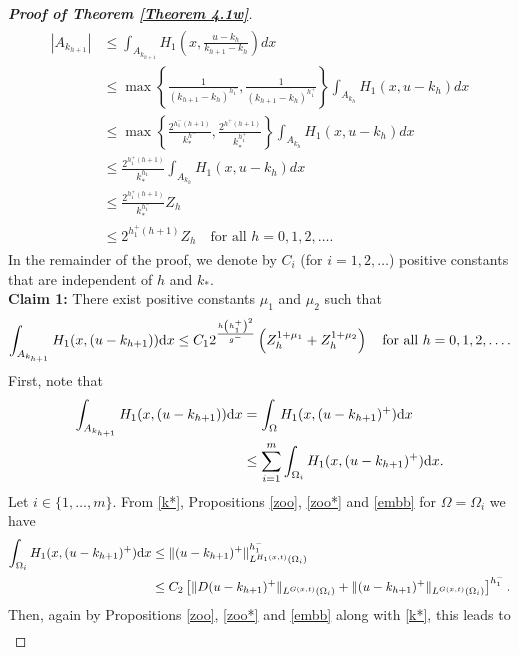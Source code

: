 \documentclass[10pt,reqno]{amsart}
\newcommand *\w{^\wedge}
\theoremstyle{definition}
\numberwithin{equation}{section}
\begin{document}
\begin{proof}[\textbf{Proof of Theorem \ref{Theorem 4.1w}}]
\begin{align}
\begin{split}
			|A_{k_{h+1}}|
			& \leq \int_{A_{k_{h+1}}}H_1\left (x,\frac{u-k_h}{k_{h+1}-k_h}\right )d x\\
            & \leq \max\left\lbrace \frac{1}{(k_{h+1}-k_h)^{h^-_1}},\frac{1}{(k_{h+1}-k_h)^{h^+_1}} \right\rbrace\int_{A_{k_{h}}} H_1\left (x,u-k_h\right )d x\\
             & \leq \max\left\lbrace \frac{2^{h^-_1(h+1)}}{k_*^{h^-}},\frac{2^{h^+(h+1)}}{k_*^{h^+_1}} \right\rbrace\int_{A_{k_{h}}} H_1\left (x,u-k_h\right )d x\\
             & \leq  \frac{2^{h^+_1(h+1)}}{k_*^{h^-_1}}\int_{A_{k_{h}}} H_1\left (x,u-k_h\right )d x\\
			& \leq \frac{2^{h^+_1(h+1)}}{k_*^{h^-_1}} Z_h\\
			& \leq 2^{h^+_1(h+1)} Z_h\quad \text{for all }h=0,1,2,\ldots.
		\end{split}
	\end{align}
In the remainder of the proof, we denote by \( C_i \) (for \( i = 1, 2, \ldots \)) positive constants that are independent of \( h \) and \( k_* \).\\	
    {\bf Claim 1:}
	There exist positive constants $\mu_1$ and $\mu_2$ such that
	\begin{equation*}%
		\int_{A_{k_{h+1}}}H_1(x,(u-k_{h+1})){\rm d}x
		\leq  C_1 2^{\frac{h\left(h^+_1\right)^2}{g^-}}\left(Z_{h}^{1+\mu_1}+Z_{h}^{1+\mu_2}\right)\quad \text{for all }h=0,1,2,\ldots.
	\end{equation*}	
First, note that
	\begin{align}\label{decompose1}
		\begin{split}
			\int_{A_{k_{h+1}}}H_1(x,(u-k_{h+1})){\rm d}x
			&=\int_{\Omega}H_1(x,(u-k_{h+1})^+){\rm d}x\\
			&\leq \sum_{i=1}^m\int_{\Omega_{i}}H_1(x,(u-k_{h+1})^+){\rm d}x.
		\end{split}
	\end{align}
Let $i\in\{1,\ldots,m\}$. From \eqref{k*}, Propositions \ref{zoo}, \ref{zoo*} and \ref{embb} for $\Omega=\Omega_{i}$ we have
	\begin{align*}
		\int_{\Omega_{i}}H_1(x,(u-k_{h+1})^+){\rm d}x
		&\leq \|(u-k_{h+1})^+\|_{L^{H_1(x,t)}(\Omega_{i})}^{h^-_1}\\
		& \leq C_2\left[\|D (u-k_{h+1})^+\|_{L^{G(x,t)}(\Omega_{i})}+\|(u-k_{h+1})^+\|_{L^{G(x,t)}(\Omega_{i})}\right]^{h^-_1}.
	\end{align*}
Then, again by Propositions \ref{zoo}, \ref{zoo*} and \ref{embb} along with \eqref{k*}, this leads to
	\begin{align*}

\end{align*}
\end{proof}
\end{document}
